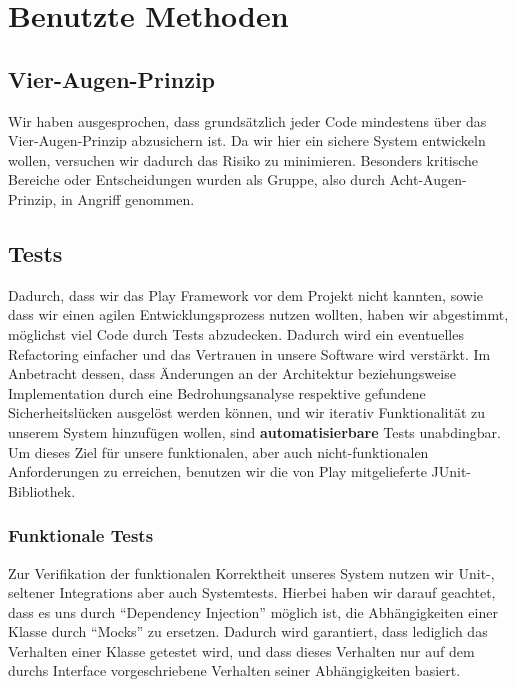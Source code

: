 \documentclass[12pt,DIV14,BCOR10mm,a4paper,parskip=half-,headsepline,headinclude,english,ngerman,bibliography=totocnumbered]{scrreprt}
\begin{document}
\vspace*{-3cm}

\tableofcontents  %

\chapter{Benutzte Methoden}
\section{Vier-Augen-Prinzip}

Wir haben ausgesprochen, dass grundsätzlich jeder Code mindestens über das Vier-Augen-Prinzip abzusichern ist.
Da wir hier ein sichere System entwickeln wollen, versuchen wir dadurch das Risiko zu minimieren.
Besonders kritische Bereiche oder Entscheidungen wurden als Gruppe, also durch Acht-Augen-Prinzip, in Angriff genommen.

\section{Tests}

Dadurch, dass wir das Play Framework vor dem Projekt nicht kannten, sowie dass wir einen agilen Entwicklungsprozess nutzen wollten, haben wir abgestimmt, möglichst viel Code durch Tests abzudecken.
Dadurch wird ein eventuelles Refactoring einfacher und das Vertrauen in unsere Software wird verstärkt.
Im Anbetracht dessen, dass Änderungen an der Architektur beziehungsweise Implementation durch eine Bedrohungsanalyse respektive gefundene Sicherheitslücken ausgelöst werden können, und wir iterativ Funktionalität zu unserem System hinzufügen wollen, sind \textbf{automatisierbare} Tests unabdingbar.
Um dieses Ziel für unsere funktionalen, aber auch nicht-funktionalen Anforderungen zu erreichen, benutzen wir die von Play mitgelieferte JUnit-Bibliothek.

\subsection{Funktionale Tests}

Zur Verifikation der funktionalen Korrektheit unseres System nutzen wir Unit-, seltener Integrations aber auch Systemtests.
Hierbei haben wir darauf geachtet, dass es uns durch \enquote{Dependency Injection} möglich ist, die Abhängigkeiten einer Klasse durch \enquote{Mocks} zu ersetzen.
Dadurch wird garantiert, dass lediglich das Verhalten einer Klasse getestet wird, und dass dieses Verhalten nur auf dem durchs Interface vorgeschriebene Verhalten seiner Abhängigkeiten basiert.
\end{document}
